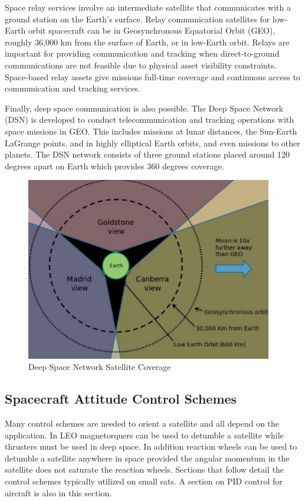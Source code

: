 \documentclass{article}
\begin{document}
Space relay services involve an intermediate satellite that
communicates with a ground station on the Earth’s surface. Relay
communication satellites for low-Earth orbit spacecraft can be in
Geosynchronous Equatorial Orbit (GEO), roughly 36,000 km from the
surface of Earth, or in low-Earth orbit. Relays are important for
providing communication and tracking when direct-to-ground
communications are not feasible due to physical asset visibility
constraints.  Space-based relay assets give missions full-time
coverage and continuous access to communication and tracking
services. 

Finally, deep space communication is also possible. The Deep Space
Network (DSN) is developed to conduct telecommunication and tracking
operations with space missions in GEO. This includes missions at lunar
distances, the Sun-Earth LaGrange points, and in highly elliptical
Earth orbits, and even missions to other planets\cite{qp40}. The DSN network
consists of three ground stations placed around 120 degrees apart on
Earth which provides 360 degrees coverage\cite{qp41}.
\begin{figure}[H]
  \begin{center}
  \includegraphics[height=80mm]{Figures/DSNSC}
  \end{center}
  \caption{Deep Space Network Satellite Coverage \cite{qp42}}
\end{figure}


\subsection{Spacecraft Attitude Control Schemes}

Many control schemes are needed to orient a satellite and all depend
on the application. In LEO magnetorquers can be used to detumble a
satellite while thrusters must be used in deep space. In addition
reaction wheels can be used to detumble a satellite anywhere in space
provided the angular momentum in the satellite does not saturate the
reaction wheels. Sections that follow detail the control schemes
typically utilized on small sats. A section on PID control for
aircraft is also in this section.
\end{document}
